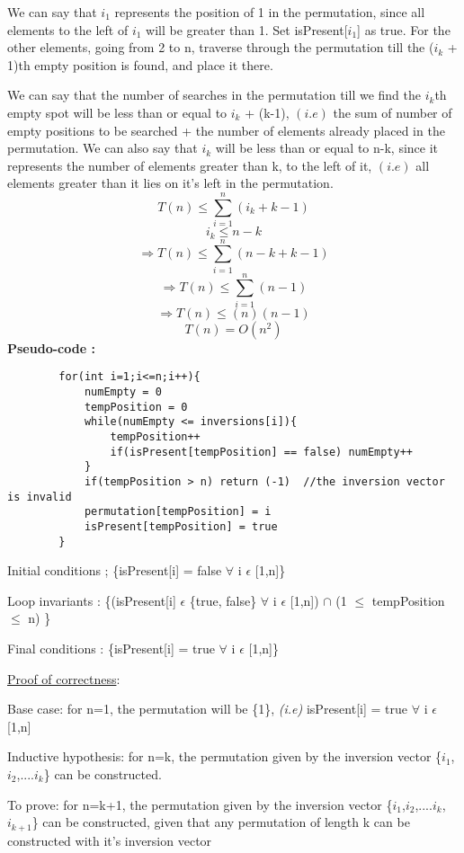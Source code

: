 \documentclass[12pt]{article}
\begin{document}
\begin{enumerate}
    We can say that $i_1$ represents the position of 1 in the permutation, since all elements to the left of $i_1$ will be greater than 1. Set isPresent[$i_1$] as true. For the other elements, going from 2 to n, traverse through the permutation till the ($i_k$ + 1)th empty position is found, and place it there. 

    We can say that the number of searches in the permutation till we find the $i_k$th empty spot will be less than or equal to $i_k$ + (k-1), $(\textit{i.e})$ the sum of number of empty positions to be searched + the number of elements already placed in the permutation. We can also say that $i_k$ will be less than or equal to n-k, since it represents the number of elements greater than k, to the left of it, $(\textit{i.e})$ all elements greater than it lies on it's left in the permutation.
     \[T(n) \leq \sum_{i=1}^{n}(i_k + k-1)\]
     \[i_k \leq n-k\]
     \[\Rightarrow T(n) \leq \sum_{i=1}^{n}(n-k + k-1)\]
     \[\Rightarrow T(n) \leq \sum_{i=1}^{n}(n-1)\]
     \[\Rightarrow T(n) \leq (n)(n-1)\]
     \[T(n) = O(n^2)\]
    \textbf{Pseudo-code :}
    \begin{verbatim}
        for(int i=1;i<=n;i++){
            numEmpty = 0
            tempPosition = 0
            while(numEmpty <= inversions[i]){
                tempPosition++
                if(isPresent[tempPosition] == false) numEmpty++
            }
            if(tempPosition > n) return (-1)  //the inversion vector is invalid
            permutation[tempPosition] = i
            isPresent[tempPosition] = true
        }
    \end{verbatim}
    Initial conditions ; \{isPresent[i] = false $\forall$ i $\epsilon$ [1,n]\}
    
    Loop invariants : \{(isPresent[i] $\epsilon$ \{true, false\} $\forall$ i $\epsilon$ [1,n]) $\cap$ (1 $\leq$ tempPosition $\leq$ n) \}
    
    Final conditions : \{isPresent[i] = true $\forall$ i $\epsilon$ [1,n]\}
    
    \underline{Proof of correctness}:
    
    Base case: for n=1, the permutation will be \{1\}, \textit{(i.e)} isPresent[i] = true $\forall$ i $\epsilon$ [1,n]
    
    Inductive hypothesis: for n=k, the permutation given by the inversion vector \{$i_1$,$i_2$,....$i_k$\} can be constructed. 
    
    To prove: for n=k+1, the permutation given by the inversion vector \{$i_1$,$i_2$,....$i_k$,$i_{k+1}$\} can be constructed, given that any permutation of length k can be constructed with it's inversion vector
    

\end{enumerate}
\end{document}
